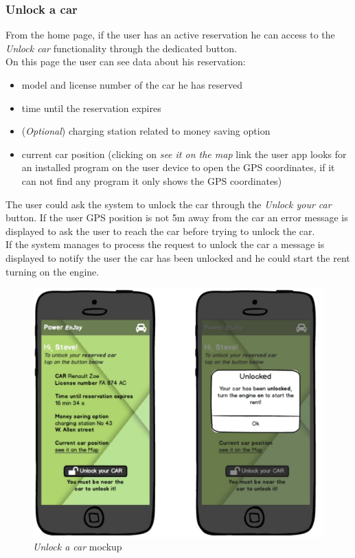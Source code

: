 \subsubsection{Unlock a car}

From the home page, if the user has an active reservation he can access to the \emph{Unlock car} functionality through the dedicated button. \\

On this page the user can see data about his reservation:
\begin{itemize}
	\item model and license number of the car he has reserved
	\item time until the reservation expires
	\item (\emph{Optional}) charging station related to money saving
	 option
	\item  current car position (clicking on \emph{see it on the map} link the user app looks for an installed program on the user device to open the GPS coordinates, if it can not find any program it only shows the GPS coordinates)
\end{itemize}

The user could ask the system to unlock the car through the \emph{Unlock your car} button. If the user GPS position is not 5m away from the car an error message is displayed to ask the user to reach the car before trying to unlock the car. \\

If the system manages to process the request to unlock the car a message is displayed to notify the user the car has been unlocked and he could start the rent turning on the engine.\\

\begin{figure}[h]
			\centering
			\includegraphics[width=0.9\linewidth]{mockups/unlockCar}
			\caption{
				\label{fig:unlockCar} 
				\emph{Unlock a car} mockup
			}
		\end{figure}

